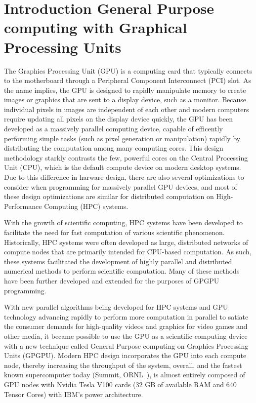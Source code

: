 \chapter{Introduction General Purpose computing with Graphical Processing Units}
\label{ch:gpu}

The Graphics Processing Unit (GPU) is a computing card that typically connects to the motherboard through a Peripheral Component Interconnect (PCI) slot.
As the name implies, the GPU is designed to rapidly manipulate memory to create images or graphics that are sent to a display device, such as a monitor.
Because individual pixels in images are independent of each other and modern computers require updating all pixels on the display device quickly, the GPU has been developed as a massively parallel computing device, capable of efficently performing simple tasks (such as pixel generation or manipulation) rapidly by distributing the computation among many computing cores.
This design methodology starkly contrasts the few, powerful cores on the Central Processing Unit (CPU), which is the default compute device on modern desktop systems.
Due to this difference in harware design, there are also several optimizations to consider when programming for massively parallel GPU devices, and most of these design optimizations are similar for distributed computation on High-Performance Computing (HPC) systems.

With the growth of scientific computing, HPC systems have been developed to facilitate the need for fast computation of various scientific phenomenon.
Historically, HPC systems were often developed as large, distributed networks of compute nodes that are primarily intended for CPU-based computation.
As such, these systems facilitated the development of highly parallel and distributed numerical methods to perform scientific computation.
Many of these methods have been further developed and extended for the purposes of GPGPU programming.

With new parallel algorithms being developed for HPC systems and GPU technology advancing rapidly to perform more computation in parallel to satiate the consumer demands for high-quality videos and graphics for video games and other media, it became possible to use the GPU as a scientific computing device with a new technique called General Purpose computing on Graphics Processing Units (GPGPU).
Modern HPC design incorporates the GPU into each compute node, thereby increasing the throughput of the system, overall, and the fastest known supercomputer today (Summit, ORNL~\cite{kahle2019}), is almost entirely composed of GPU nodes with Nvidia Tesla V100 cards (32 GB of available RAM and 640 Tensor Cores) with IBM's power architecture.

